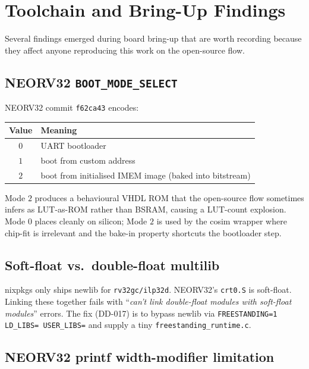 \documentclass[11pt,a4paper]{article}
\begin{document}
\section{Toolchain and Bring-Up Findings}

Several findings emerged during board bring-up that are worth recording
because they affect anyone reproducing this work on the open-source
flow.

\subsection{NEORV32 \texttt{BOOT\_MODE\_SELECT}}

NEORV32 commit \texttt{f62ca43} encodes:
\begin{center}\small
\begin{tabular}{cl}
\toprule
\textbf{Value} & \textbf{Meaning}\\
\midrule
$0$ & UART bootloader \\
$1$ & boot from custom address \\
$2$ & boot from initialised IMEM image (baked into bitstream)\\
\bottomrule
\end{tabular}
\end{center}
Mode $2$ produces a behavioural VHDL ROM that the open-source flow
sometimes infers as LUT-as-ROM rather than BSRAM, causing a LUT-count
explosion. Mode $0$ places cleanly on silicon; Mode $2$ is used by the
cosim wrapper where chip-fit is irrelevant and the bake-in property
shortcuts the bootloader step.

\subsection{Soft-float vs.\ double-float multilib}

nixpkgs only ships newlib for \texttt{rv32gc/ilp32d}. NEORV32's
\texttt{crt0.S} is soft-float. Linking these together fails with
``\emph{can't link double-float modules with soft-float modules}''
errors. The fix (DD-017) is to bypass newlib via
\texttt{FREESTANDING=1 LD\_LIBS= USER\_LIBS=} and supply a tiny
\texttt{freestanding\_runtime.c}.

\subsection{NEORV32 printf width-modifier limitation}
\end{document}
